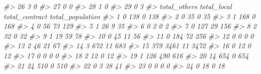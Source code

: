 \documentclass[
]{krantz}
\makeatletter
\newenvironment{Shaded}{\begin{snugshade}}{\end{snugshade}}
\newcommand{\CommentTok}[1]{\textcolor[rgb]{0.37,0.37,0.37}{\textit{#1}}}
\newenvironment{kframe}{%
\medskip{}
\setlength{\fboxsep}{.8em}
 \def\at@end@of@kframe{}%
 \ifinner\ifhmode%
  \def\at@end@of@kframe{\end{minipage}}%
  \begin{minipage}{\columnwidth}%
 \fi\fi%
 \def\FrameCommand##1{\hskip\@totalleftmargin \hskip-\fboxsep
 \colorbox{shadecolor}{##1}\hskip-\fboxsep
     \hskip-\linewidth \hskip-\@totalleftmargin \hskip\columnwidth}%
 \MakeFramed {\advance\hsize-\width
   \@totalleftmargin\z@ \linewidth\hsize
   \@setminipage}}%
 {\par\unskip\endMakeFramed%
 \at@end@of@kframe}
\renewenvironment{Shaded}{\begin{kframe}}{\end{kframe}}
\makeatother
\begin{document}
\begin{Shaded}
\begin{Highlighting}[]
\CommentTok{\#\textgreater{} 26                                  3                               0}
\CommentTok{\#\textgreater{} 27                                  0                               0}
\CommentTok{\#\textgreater{} 28                                  1                               0}
\CommentTok{\#\textgreater{} 29                                  0                               3}
\CommentTok{\#\textgreater{}    total\_others total\_local total\_contract total\_population}
\CommentTok{\#\textgreater{} 1             0         138              0              138}
\CommentTok{\#\textgreater{} 2             0          35              0               35}
\CommentTok{\#\textgreater{} 3             1         168              0              168}
\CommentTok{\#\textgreater{} 4             0          56             73              129}
\CommentTok{\#\textgreater{} 5             1          26              9               35}
\CommentTok{\#\textgreater{} 6             0           2              0                2}
\CommentTok{\#\textgreater{} 7             0         127             29              156}
\CommentTok{\#\textgreater{} 8             2          32              0               32}
\CommentTok{\#\textgreater{} 9             1          19             59               78}
\CommentTok{\#\textgreater{} 10            0          45             11               56}
\CommentTok{\#\textgreater{} 11            0         184             72              256}
\CommentTok{\#\textgreater{} 12            0           0              0                0}
\CommentTok{\#\textgreater{} 13            2          46             21               67}
\CommentTok{\#\textgreater{} 14            3         672             11              683}
\CommentTok{\#\textgreater{} 15          379        3461             11             3472}
\CommentTok{\#\textgreater{} 16            0          12              0               12}
\CommentTok{\#\textgreater{} 17            0           0              0                0}
\CommentTok{\#\textgreater{} 18            2          12              0               12}
\CommentTok{\#\textgreater{} 19            1         126            490              616}
\CommentTok{\#\textgreater{} 20           14         654              0              654}
\CommentTok{\#\textgreater{} 21           24         510              0              510}
\CommentTok{\#\textgreater{} 22            0           3             38               41}
\CommentTok{\#\textgreater{} 23            0           0              0                0}
\CommentTok{\#\textgreater{} 24            0          18              0               18}

\end{Highlighting}
\end{Shaded}
\end{document}
